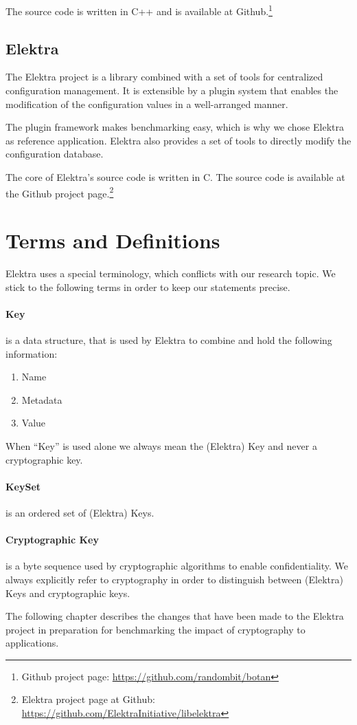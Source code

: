 The source code is written in C++ and is available at Github.\footnote{Github project page: \url{https://github.com/randombit/botan}}

	\subsection{Elektra}

The Elektra project is a library combined with a set of tools for centralized configuration management.
It is extensible by a plugin system that enables the modification of the configuration values in a well-arranged manner.\cite{raab2010thesis}

The plugin framework makes benchmarking easy, which is why we chose Elektra as reference application.
Elektra also provides a set of tools to directly modify the configuration database.

The core of Elektra's source code is written in C.
The source code is available at the Github project page.\footnote{Elektra project page at Github: \url{https://github.com/ElektraInitiative/libelektra}}

\section{Terms and Definitions}

Elektra uses a special terminology, which conflicts with our research topic.
We stick to the following terms in order to keep our statements precise.

\paragraph{Key} is a data structure, that is used by Elektra to combine and hold the following information:
\begin{enumerate}
  \item Name
  \item Metadata
  \item Value
\end{enumerate}
When ``Key'' is used alone we always mean the (Elektra) Key and never a cryptographic key.

\paragraph{KeySet} is an ordered set of (Elektra) Keys.

\paragraph{Cryptographic Key} is a byte sequence used by cryptographic algorithms to enable confidentiality.
We always explicitly refer to cryptography in order to distinguish between (Elektra) Keys and cryptographic keys.

The following chapter describes the changes that have been made to the Elektra project in preparation for benchmarking the impact of cryptography to applications.
